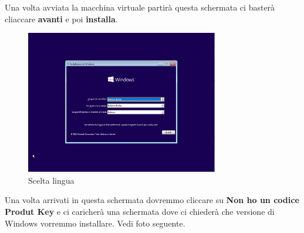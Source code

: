 \documentclass[../main.tex]{subfiles}
\begin{document}
Una volta avviata la macchina virtuale partirà questa schermata ci basterà cliaccare \textbf{avanti} e poi \textbf{installa}. 
\begin{figure}[h]
    \centering
    \includegraphics[width=0.75\textwidth]{Images/conf1.PNG}
    \caption{Scelta lingua}
\end{figure}
Una volta arrivati in questa schermata dovremmo cliccare su \textbf{Non ho un codice Produt Key} e ci caricherà una schermata dove ci chiederà che versione di Windows vorremmo installare. Vedi foto seguente.
\end{document}
